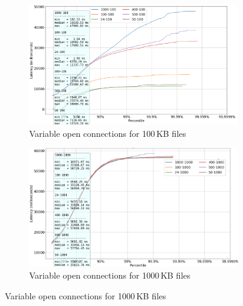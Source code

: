 \documentclass[runningheads]{llncs}
\begin{document}
\begin{figure}[p]
\centering
  \begin{subfigure}[t]{0.7\textwidth}
        \includegraphics[width=1\textwidth]{plotfile100.png}\vspace{-0.2em}
        \caption{Variable open connections for 100\,KB files}\vspace{-0.2em}
			\label {fig:latency-to-oc-100}
  \end{subfigure}
  \begin{subfigure}[t]{0.7\textwidth}
        \includegraphics[width=1\textwidth]{plotfile1000.png}\vspace{-0.2em}
        \caption{Variable open connections for 1000\,KB files}\vspace{-0.2em}
	  \label {fig:latency-to-oc-1000}
  \end{subfigure}


\end{figure}
\end{document}
